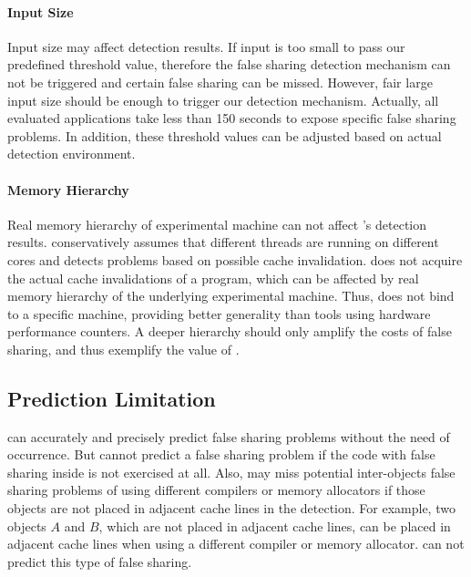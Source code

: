 \paragraph{Input Size} Input size may affect detection results. If input is too small to pass our predefined threshold value, therefore the false sharing detection mechanism can not be triggered and certain false sharing can be missed. However, fair large input size should be enough to trigger our detection mechanism. Actually, all evaluated applications take less than 150 seconds to expose specific false sharing problems. In addition, these threshold values can be adjusted based on actual detection environment.

\paragraph{Memory Hierarchy} Real memory hierarchy of experimental machine can not affect \Predator{}'s detection results. \Predator{} conservatively assumes that different threads are running on different cores and detects problems based on possible cache invalidation. \Predator{} does not acquire the actual cache invalidations of a program, which can be affected by real memory hierarchy of the underlying experimental machine. Thus, \Predator{} does not bind to a specific machine, providing better generality than tools using hardware performance counters. A deeper hierarchy should only amplify the costs of false sharing, and thus exemplify the value of \Predator{}.

\subsection{Prediction Limitation} 
\Predator{} can accurately and precisely predict false sharing problems without the need of occurrence. But \Predator{} cannot  predict a false sharing problem if the code with false sharing inside is not exercised at all. Also, \Predator{} may miss potential inter-objects false sharing problems of using different compilers or memory allocators if those objects are not placed in adjacent cache lines in the detection. For example, two objects $A$ and $B$, which are not placed in adjacent cache lines, can be placed in adjacent cache lines when using a different compiler or memory allocator. \Predator{} can not predict this type of false sharing. 